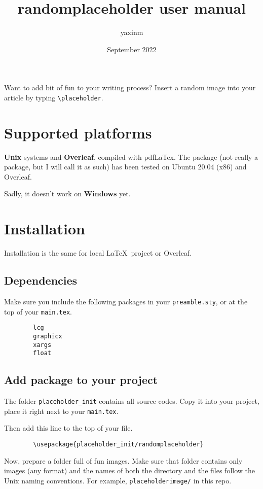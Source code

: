\documentclass[12pt]{article}
\title{randomplaceholder user manual}
\author{yaxinm}
\date{September 2022}
\begin{document}
    \maketitle
    Want to add bit of fun to your writing process?
    Insert a random image into your article by typing \lstinline{\placeholder}. 
    \section{Supported platforms}
    \textbf{Unix} systems and \textbf{Overleaf}, compiled with pdfLaTex. 
    The package (not really a package, but I will call it as such) 
    has been tested on Ubuntu 20.04 (x86) and Overleaf.

    Sadly, it doesn't work on \textbf{Windows} yet.

    \section{Installation}
    Installation is the same for local \LaTeX~project or Overleaf.

    \subsection{Dependencies}
    Make sure you include the following packages in your \lstinline{preamble.sty}, or at the top of your \lstinline{main.tex}.
    \begin{lstlisting}
        lcg
        graphicx
        xargs
        float
    \end{lstlisting}

    \subsection{Add package to your project}
    The folder \lstinline{placeholder_init} contains all source codes.
    Copy it into your project, place it right next to your \lstinline{main.tex}. 
    
    Then add this line to the top of your file.
    \begin{lstlisting}
        \usepackage{placeholder_init/randomplaceholder}
    \end{lstlisting}

    Now, prepare a folder full of fun images. Make sure that folder contains only images (any format) and the names of both the directory and the files follow the Unix naming conventions. For example, \lstinline{placeholderimage/} in this repo.
\end{document}
